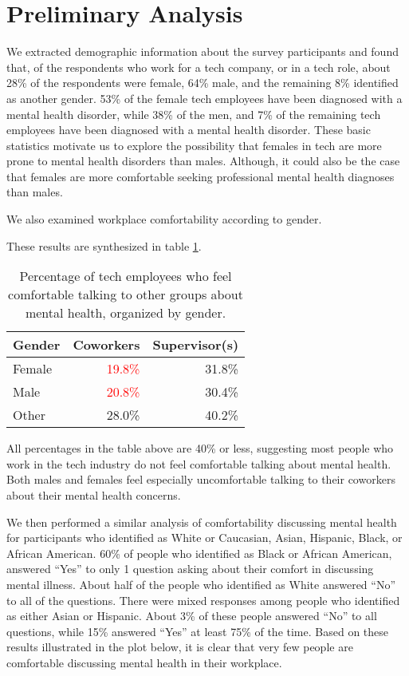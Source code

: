 \documentclass[times, twocolumn]{article}
\begin{document}
\section{Preliminary Analysis}

We extracted demographic information about the survey participants and found 
that, of the respondents who work for a tech company, or in a tech role, about 
28\% of the respondents were female, 64\% male, and the remaining 8\% identified 
as another gender. 53\% of the female tech employees have been diagnosed with a 
mental health disorder, while 38\% of the men, and 7\% of the remaining tech 
employees have been diagnosed with a mental health disorder. These basic statistics 
motivate us to explore the possibility that females in tech are more prone to mental 
health disorders than males. Although, it could also be the case that females are 
more comfortable seeking professional mental health diagnoses than males.

We also examined workplace comfortability according to gender. 


These results are 
synthesized in table \ref{table:comfort-percentage-table}.


\begin{table}
    \centering
    \begin{tabular}{lrr}
        \hline \textbf{Gender} & \textbf{Coworkers} & \textbf{Supervisor(s)} \\ \hline
        Female & \textcolor{red}{19.8\%} & 31.8\% \\
        Male & \textcolor{red}{20.8\%} & 30.4\% \\
        Other & 28.0\% & \textcolor{GoodGreen}{40.2\%} \\
        \hline
    \end{tabular}
    \caption{
        Percentage of tech employees who feel comfortable talking to other groups
        about mental health, organized by gender.
    } 
    \label{table:comfort-percentage-table} 
\end{table}

All percentages in the table above are 40\% or less, suggesting most people who 
work in the tech industry do not feel comfortable talking about mental health. 
Both males and females feel especially uncomfortable talking to their coworkers 
about their mental health concerns. 

We then performed a similar analysis of comfortability discussing mental health 
for participants who identified as White or Caucasian, Asian, Hispanic, Black, 
or African American. 60\% of people who identified as Black or African American, 
answered “Yes” to only 1 question asking about their comfort in discussing mental 
illness. About half of the people who identified as White answered “No” to all of 
the questions. There were mixed responses among people who identified as either 
Asian or Hispanic. About 3\% of these people answered “No” to all questions, while 
15\% answered “Yes” at least 75\% of the time. Based on these results illustrated 
in the plot below, it is clear that very few people are comfortable discussing 
mental health in their workplace.
\end{document}
